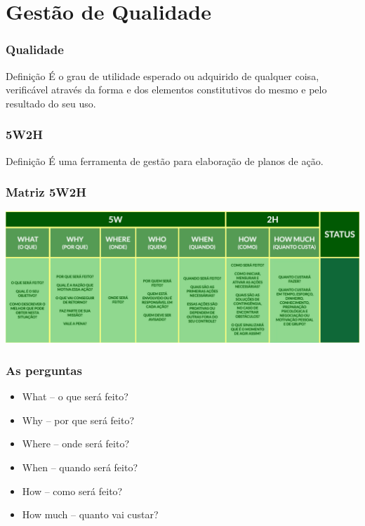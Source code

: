 \documentclass[aspectratio=169]{beamer}
\begin{document}
\section{Gestão de Qualidade}

\begin{frame}
	\frametitle{Qualidade}

	\begin{block}{Defini\c cão}
		 É o grau de utilidade esperado ou adquirido de qualquer coisa, verificável através da forma e dos elementos constitutivos do mesmo e pelo resultado do seu uso.
	\end{block}
\end{frame}

\begin{frame}
	\frametitle{5W2H}

	\begin{block}{Defini\c cão}
		 É uma ferramenta de gestão para elaboração de planos de ação.
	\end{block}
\end{frame}

\begin{frame}
	\frametitle{Matriz 5W2H}
	
	\begin{center}
		\includegraphics[scale=0.35]{img/5w2h}
	\end{center}
\end{frame}

\begin{frame}
	\frametitle{As perguntas}

	\begin{itemize}
		\item What – o que será feito?
		\item Why – por que será feito?
		\item Where – onde será feito?
		\item When – quando será feito?
	\end{itemize}
	
	\begin{itemize}
		\item How – como será feito?
		\item How much – quanto vai custar?
	\end{itemize}		
\end{frame}
\end{document}
